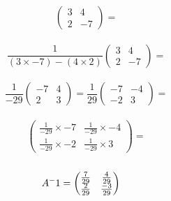 \documentclass[a4paper,10pt]{article}
\begin{document}
      \begin{equation*}
        \begin{pmatrix}
          3 & 4\\2 & -7
        \end{pmatrix}
        =
      \end{equation*}
      \\
      \begin{equation*}
        \frac{1}{(3 \times -7) - (4 \times 2)}
        \begin{pmatrix}
          3 & 4\\2 & -7
        \end{pmatrix}
        =
      \end{equation*}
      \\
      \begin{equation*}
        \frac{1}{-29}
        \begin{pmatrix}
          -7 & 4\\2 & 3
        \end{pmatrix}
        =
        \frac{1}{29}
        \begin{pmatrix}
          -7 & -4\\-2 & 3
        \end{pmatrix}
        =
      \end{equation*}
      \\
      \begin{equation*}
        \begin{pmatrix}
          \frac{1}{-29} \times -7 & \frac{1}{-29} \times -4\\
          \frac{1}{-29} \times -2 & \frac{1}{-29} \times  3
        \end{pmatrix}
        =
      \end{equation*}
      \\
      \begin{equation*}
        A^-1 =
        \begin{pmatrix}
          \frac{7}{29} & \frac{4}{29}\\\frac{2}{29} & \frac{-3}{29}
        \end{pmatrix}
        \hspace{0.4cm}
      \end{equation*}
      \newpage
\end{document}
